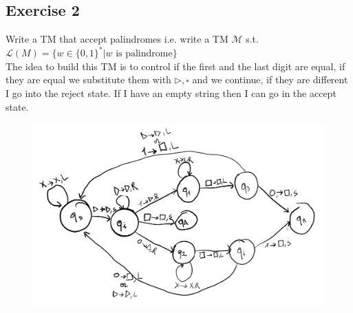 \subsection{Exercise 2}
Write a TM that accept palindromes i.e. write a TM \(\mathcal{M}\) s.t. \(\mathcal{L}(M) = \{w \in \{0,1\}^* | w \text{ is palindrome}\}\) \\
The idea to build this TM is to control if the first and the last digit are equal, if they are equal we substitute them with \(\rhd, \square\) and we continue, if they are different I go into the reject state. If I have an empty string then I can go in the accept state.
\begin{figure}[H]
	\centerline{\includegraphics[scale=0.4]{figures/old/TM_palindrome}}
\end{figure}

